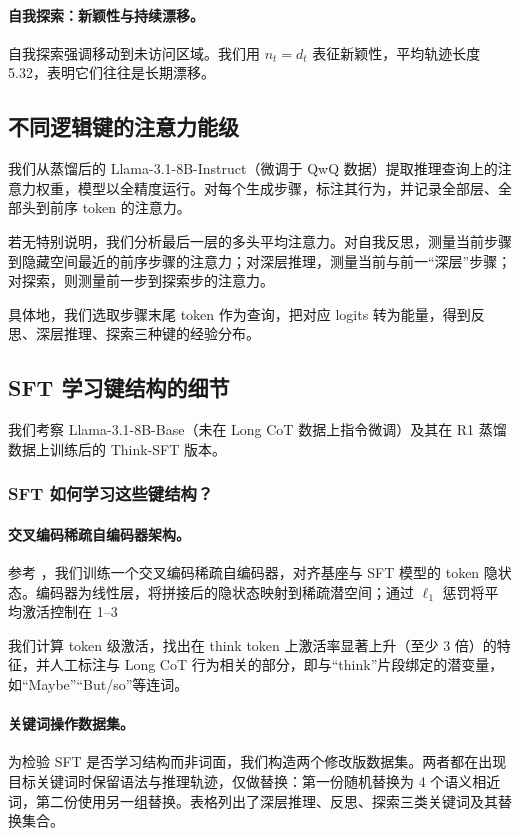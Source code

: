 \paragraph{自我探索：新颖性与持续漂移。}
自我探索强调移动到未访问区域。我们用 $n_t=d_t$ 表征新颖性，平均轨迹长度 5.32，表明它们往往是长期漂移。


\subsection{不同逻辑键的注意力能级}
\label{append:attention}
我们从蒸馏后的 Llama-3.1-8B-Instruct（微调于 QwQ 数据）提取推理查询上的注意力权重，模型以全精度运行。对每个生成步骤，标注其行为，并记录全部层、全部头到前序 token 的注意力。

若无特别说明，我们分析最后一层的多头平均注意力。对自我反思，测量当前步骤到隐藏空间最近的前序步骤的注意力；对深层推理，测量当前与前一“深层”步骤；对探索，则测量前一步到探索步的注意力。\vspace{-5pt}

具体地，我们选取步骤末尾 token 作为查询，把对应 logits 转为能量，得到反思、深层推理、探索三种键的经验分布。

\subsection{SFT 学习键结构的细节}
\label{append:sft-learning}
我们考察 Llama-3.1-8B-Base（未在 Long CoT 数据上指令微调）及其在 R1 蒸馏数据上训练后的 Think-SFT 版本。\vspace{-5pt}

\subsubsection{SFT 如何学习这些键结构？}
\paragraph{交叉编码稀疏自编码器架构。}
\label{app:sft-sae-arch}
参考 \citet{jiralerspong2025model,lindsey2025sparse}，我们训练一个交叉编码稀疏自编码器，对齐基座与 SFT 模型的 token 隐状态。编码器为线性层，将拼接后的隐状态映射到稀疏潜空间；通过 $\ell_1$ 惩罚将平均激活控制在 1--3%

我们计算 token 级激活，找出在 think token 上激活率显著上升（至少 3 倍）的特征，并人工标注与 Long CoT 行为相关的部分，即与“think”片段绑定的潜变量，如“Maybe”“But/so”等连词。

\paragraph{关键词操作数据集。}
\label{app:sft-sae-keyword}
为检验 SFT 是否学习结构而非词面，我们构造两个修改版数据集。两者都在出现目标关键词时保留语法与推理轨迹，仅做替换：第一份随机替换为 4 个语义相近词，第二份使用另一组替换。表格列出了深层推理、反思、探索三类关键词及其替换集合。

